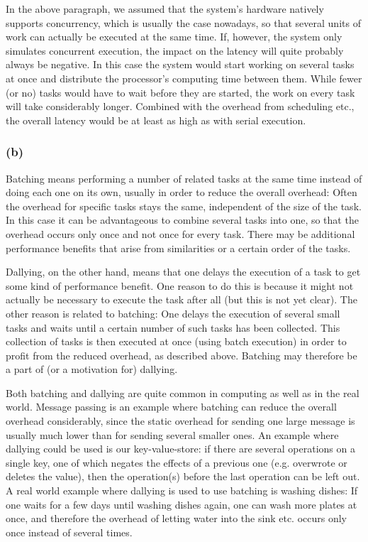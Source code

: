 \documentclass[12pt,a4paper]{article}
\begin{document}
In the above paragraph, we assumed that the system's hardware natively supports concurrency, which is usually the case nowadays, so that several units of work can actually be executed at the same time. If, however, the system only simulates concurrent execution, the impact on the latency will quite probably always be negative. In this case the system would start working on several tasks at once and distribute the processor's computing time between them. While fewer (or no) tasks would have to wait before they are started, the work on every task will take considerably longer. Combined with the overhead from scheduling etc., the overall latency would be at least as high as with serial execution.

\subsubsection*{(b)}
Batching means performing a number of related tasks at the same time instead of doing each one on its own, usually in order to reduce the overall overhead: Often the overhead for specific tasks stays the same, independent of the size of the task. In this case it can be advantageous to combine several tasks into one, so that the overhead occurs only once and not once for every task. There may be additional performance benefits that arise from similarities or a certain order of the tasks. 

Dallying, on the other hand, means that one delays the execution of a task to get some kind of performance benefit. One reason to do this is because it might not actually be necessary to execute the task after all (but this is not yet clear). The other reason is related to batching: One delays the execution of several small tasks and waits until a certain number of such tasks has been collected. This collection of tasks is then executed at once (using batch execution) in order to profit from the reduced overhead, as described above. Batching may therefore be a part of (or a motivation for) dallying.

Both batching and dallying are quite common in computing as well as in the real world. Message passing is an example where batching can reduce the overall overhead considerably, since the static overhead for sending one large message is usually much lower than for sending several smaller ones. An example where dallying could be used is our key-value-store: if there are several operations on a single key, one of which negates the effects of a previous one (e.g. overwrote or deletes the value), then the operation(s) before the last operation can be left out. A real world example where dallying is used to use batching is washing dishes: If one waits for a few days until washing dishes again, one can wash more plates at once, and therefore the overhead of letting water into the sink etc. occurs only once instead of several times.
\end{document}
